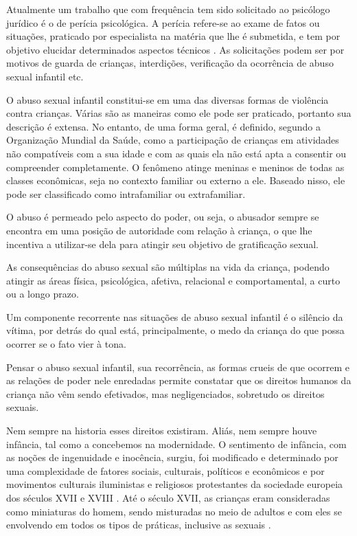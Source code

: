 Atualmente um trabalho que com frequência tem sido solicitado ao psicólogo jurídico é o de perícia psicológica. A perícia refere-se ao exame de fatos ou situações, praticado por especialista na matéria que lhe é submetida, e tem por objetivo elucidar determinados aspectos técnicos . As solicitações podem ser por motivos de guarda de crianças, interdições, verificação da ocorrência de abuso sexual infantil etc.

O abuso sexual infantil constitui-se em uma das diversas formas de violência contra crianças. Várias são as maneiras como ele pode ser praticado, portanto sua descrição é extensa. No entanto, de uma forma geral, é definido, segundo a Organização Mundial da Saúde, como a participação de crianças em atividades não compatíveis com a sua idade e com as quais ela não está apta a consentir ou compreender completamente.  O fenômeno atinge meninas e meninos de todas as classes econômicas, seja no contexto familiar ou externo a ele. Baseado nisso, ele pode ser classificado como intrafamiliar ou extrafamiliar.
	
O abuso é permeado pelo aspecto do poder, ou seja, o abusador sempre se encontra em uma posição de autoridade com relação à criança, o que lhe incentiva a utilizar-se dela para atingir seu objetivo de gratificação sexual. 
	
As consequências do abuso sexual são múltiplas na vida da criança, podendo atingir as áreas física, psicológica, afetiva, relacional e comportamental, a curto ou a longo prazo. 

Um componente recorrente nas situações de abuso sexual infantil é o silêncio da vítima, por detrás do qual está, principalmente, o medo da criança do que possa ocorrer se o fato vier à tona. 

Pensar o abuso sexual infantil, sua recorrência, as formas crueis de que ocorrem e as relações de poder nele enredadas permite constatar que os direitos humanos da criança não vêm sendo efetivados, mas negligenciados, sobretudo os direitos sexuais.  

Nem sempre na historia esses direitos existiram. Aliás, nem sempre houve infância, tal como a concebemos na modernidade. O sentimento de infância, com as noções de ingenuidade e inocência, surgiu, foi modificado e determinado por uma complexidade de fatores sociais, culturais, políticos e econômicos e por movimentos culturais iluministas e religiosos protestantes da sociedade europeia dos séculos XVII e XVIII \cite{ARIES1981}. Até o século XVII, as crianças eram consideradas como miniaturas do homem, sendo misturadas no meio de adultos e com eles se envolvendo em todos os tipos de práticas, inclusive as sexuais \cite{ARIES2011}. 
	
